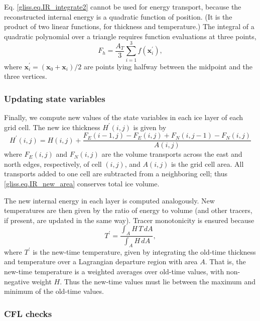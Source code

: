 Eq. \eqref{gliss.eq.IR_integrate2} cannot be used for energy transport, because
the reconstructed internal energy is a quadratic function of position.
(It is the product of two linear functions, for thickness and temperature.)
The integral of a quadratic polynomial over a triangle requires
function evaluations at three points,
\begin{equation}
  \label{gliss.eq.IR_integrate2}
  F_h = \frac{A_T}{3}\sum_{i=1}^3 f\left({\mathbf x}^\prime_i\right),
\end{equation}
where $\mathbf{x}_i^\prime = (\mathbf{x}_0+\mathbf{x}_i)/2$ are
points lying halfway between the midpoint and the three vertices.

\subsubsection{Updating state variables}
\label{sc:glissade-IR-update}

Finally, we compute new values of the state variables in each ice layer of each grid cell.
The new ice thickness $H^\prime(i,j)$ is given by
\begin{equation}
  \label{gliss.eq.IR_new_area}
  H^\prime(i,j) = H(i,j) + 
  \frac{F_{E}(i-1,j) - F_{E}(i,j) + F_{N}(i,j-1) - F_{N}(i,j)} {A(i,j)}
\end{equation}
where $F_{E}(i,j)$ and $F_{N}(i,j)$ are the volume transports across the
east and north edges, respectively, of cell $(i,j)$, and $A(i,j)$
is the grid cell area.   All transports added to one cell are
subtracted from a neighboring cell; thus \eqref{gliss.eq.IR_new_area}
conserves total ice volume.

The new internal energy in each layer is computed analogously.
New temperatures are then given by the ratio of energy to volume
(and other tracers, if present, are updated in the same way).
Tracer monotonicity is ensured because
\[ T^\prime = \frac{\int_A H \, T \, dA} {\int_A H \, dA}, \]
where $T^\prime$ is the new-time temperature, given by 
integrating the old-time thickness and temperature
over a Lagrangian departure region with area $A$. That is,
the new-time temperature is a weighted averages over
old-time values, with non-negative weight $H$. Thus the
new-time values must lie between the maximum and minimum of the
old-time values.

\subsubsection{CFL checks}
\label{sc:glissade-IR-CFL}

